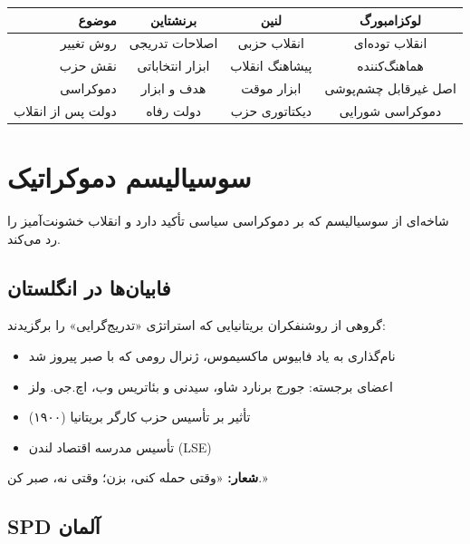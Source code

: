 \begin{comparebox}
\begin{table}[H]
\centering
\small
\begin{tabular}{r|c|c|c}
\toprule
\textbf{موضوع} & \textbf{برنشتاین} & \textbf{لنین} & \textbf{لوکزامبورگ} \\
\midrule
روش تغییر & اصلاحات تدریجی & انقلاب حزبی & انقلاب توده‌ای \\
نقش حزب & ابزار انتخاباتی & پیشاهنگ انقلاب & هماهنگ‌کننده \\
دموکراسی & هدف و ابزار & ابزار موقت & اصل غیرقابل چشم‌پوشی \\
دولت پس از انقلاب & دولت رفاه & دیکتاتوری حزب & دموکراسی شورایی \\
\bottomrule
\end{tabular}
\end{table}
\end{comparebox}

\section{سوسیالیسم دموکراتیک}

شاخه‌ای از سوسیالیسم که بر دموکراسی سیاسی تأکید دارد و انقلاب خشونت‌آمیز را رد می‌کند.

\subsection{فابیان‌ها در انگلستان}

\begin{historybox}
گروهی از روشنفکران بریتانیایی که استراتژی «تدریج‌گرایی» را برگزیدند:
\begin{itemize}[nosep]
    \item نام‌گذاری به یاد فابیوس ماکسیموس، ژنرال رومی که با صبر پیروز شد
    \item اعضای برجسته: جورج برنارد شاو، سیدنی و بئاتریس وب، اچ.جی. ولز
    \item تأثیر بر تأسیس حزب کارگر بریتانیا (۱۹۰۰)
    \item تأسیس مدرسه اقتصاد لندن (LSE)
\end{itemize}
\textbf{شعار:} «وقتی حمله کنی، بزن؛ وقتی نه، صبر کن.»
\end{historybox}

\subsection{SPD آلمان}


